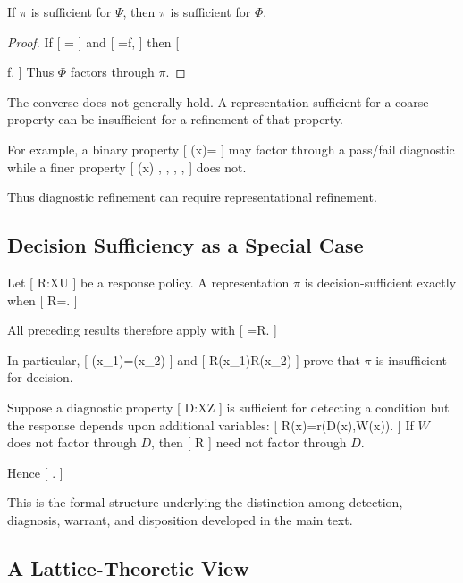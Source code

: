 \documentclass[11pt]{article}
\begin{document}
\begin{proposition}
If $\pi$ is sufficient for $\Psi$, then $\pi$ is sufficient for $\Phi$.
\end{proposition}

\begin{proof}
If
[
\Psi=\widehat{\Psi}\circ\pi
]
and
[
\Phi=f\circ\Psi,
]
then
[
\Phi

f\circ\widehat{\Psi}\circ\pi.
]
Thus $\Phi$ factors through $\pi$.
\end{proof}

The converse does not generally hold. A representation sufficient for a coarse property can be insufficient for a refinement of that property.

For example, a binary property
[
\Phi(x)=
]
may factor through a pass/fail diagnostic while a finer property
[
\Psi(x)
\in
{
,
,
,
,
}
]
does not.

Thus diagnostic refinement can require representational refinement.

\subsection{Decision Sufficiency as a Special Case}

Let
[
R:\mathcal X\to\mathcal U
]
be a response policy. A representation $\pi$ is decision-sufficient exactly when
[
R=\circ\pi.
]

All preceding results therefore apply with
[
\Phi=R.
]

In particular,
[
\pi(x_1)=\pi(x_2)
]
and
[
R(x_1)\neq R(x_2)
]
prove that $\pi$ is insufficient for decision.

Suppose a diagnostic property
[
D:\mathcal X\to\mathcal Z
]
is sufficient for detecting a condition but the response depends upon additional variables:
[
R(x)=r(D(x),W(x)).
]
If $W$ does not factor through $D$, then
[
R
]
need not factor through $D$.

Hence
[
\not\Rightarrow
{}.
]

This is the formal structure underlying the distinction among detection, diagnosis, warrant, and disposition developed in the main text.

\subsection{A Lattice-Theoretic View}
\end{document}
